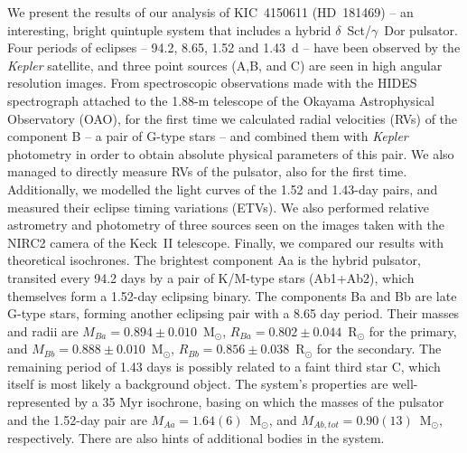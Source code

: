 \documentclass{aa}
\newcommand{\kep}{{\it Kepler }}
\begin{document}
  \abstract
   {}
{We present the results of our analysis of KIC~4150611 (HD~181469) -- an interesting, 
bright quintuple system that includes a hybrid $\delta$~Sct/$\gamma$~Dor pulsator. 
Four periods of eclipses -- 94.2, 8.65, 1.52 and 1.43~d -- have been observed by the \kep satellite, 
and three point sources (A,B, and C) are seen in high angular resolution images.
}
{From spectroscopic observations made with the HIDES spectrograph attached to the 1.88-m 
telescope of the Okayama Astrophysical Observatory (OAO), %
for the first time we calculated radial velocities (RVs) of the component B -- a pair of G-type stars -- 
and combined them with \kep photometry in order to obtain absolute physical parameters of this 
pair. We also managed to directly measure RVs of the pulsator, also for the first time. 
Additionally, we modelled the light curves of the 1.52 and 1.43-day pairs, and measured their 
eclipse timing variations (ETVs). We also performed relative astrometry and photometry of 
three sources seen on the images taken with the NIRC2 camera of the Keck~II telescope.
Finally, we compared our results with theoretical isochrones.
}
{The brightest component Aa is the hybrid pulsator, transited 
every 94.2 days by a pair of K/M-type stars (Ab1+Ab2), which themselves form a 1.52-day 
eclipsing binary. The components Ba and Bb are late G-type stars, forming 
another eclipsing pair with a 8.65 day period. Their masses and radii are
$M_{Ba}=0.894\pm0.010$~M$_\odot$, $R_{Ba}=0.802\pm0.044$~R$_\odot$ for the primary, and 
$M_{Bb}=0.888\pm0.010$~M$_\odot$, $R_{Bb}=0.856\pm0.038$~R$_\odot$ for the secondary.
The remaining period of 1.43 days is possibly related to a faint third star C, which
itself is most likely a background object.
The system's properties are well-represented by a 35 Myr isochrone, basing on which the masses of 
the pulsator and the 1.52-day pair are $M_{Aa}=1.64(6)$~M$_\odot$,
and $M_{Ab,tot}=0.90(13)$~M$_\odot$, respectively. There are also hints of additional
bodies in the system.
   }
   {}


   \maketitle
%
\end{document}
